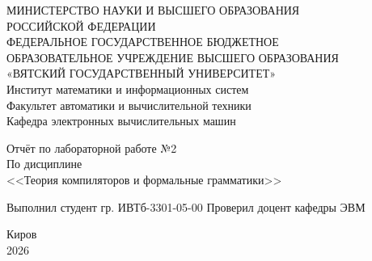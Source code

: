\documentclass[oneside,a4paper,14pt]{extarticle}
\begin{document}
\newpage\thispagestyle{empty}
\begin{center}
	МИНИСТЕРСТВО НАУКИ И ВЫСШЕГО ОБРАЗОВАНИЯ\\
	РОССИЙСКОЙ ФЕДЕРАЦИИ\\
	ФЕДЕРАЛЬНОЕ ГОСУДАРСТВЕННОЕ БЮДЖЕТНОЕ\\
	ОБРАЗОВАТЕЛЬНОЕ УЧРЕЖДЕНИЕ ВЫСШЕГО ОБРАЗОВАНИЯ\\
	«ВЯТСКИЙ ГОСУДАРСТВЕННЫЙ УНИВЕРСИТЕТ»\\
	Институт математики и информационных систем\\
	Факультет автоматики и вычислительной техники\\
	Кафедра электронных вычислительных машин
\end{center}
\vspace{20mm}
\begin{center}
	Отчёт по лабораторной работе №2\\
	По дисциплине\\
	<<Теория компиляторов и формальные грамматики>>\\
\end{center}
\vfill
Выполнил студент гр. ИВТб-3301-05-00 \hfill
{}
Проверил доцент кафедры ЭВМ\hfill
{}
\vfill
\begin{center}
	Киров\\
	2026
\end{center}
\end{document}
